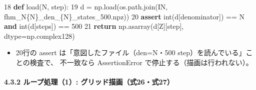 \documentclass[
  a4paper,
]{ltjsarticle}
\newenvironment{Shaded}{}{}
\newcommand{\BuiltInTok}[1]{\textcolor[rgb]{0.00,0.50,0.00}{#1}}
\newcommand{\ControlFlowTok}[1]{\textcolor[rgb]{0.00,0.44,0.13}{\textbf{#1}}}
\newcommand{\DecValTok}[1]{\textcolor[rgb]{0.25,0.63,0.44}{#1}}
\newcommand{\KeywordTok}[1]{\textcolor[rgb]{0.00,0.44,0.13}{\textbf{#1}}}
\newcommand{\NormalTok}[1]{#1}
\newcommand{\OperatorTok}[1]{\textcolor[rgb]{0.40,0.40,0.40}{#1}}
\newcommand{\SpecialCharTok}[1]{\textcolor[rgb]{0.25,0.44,0.63}{#1}}
\newcommand{\SpecialStringTok}[1]{\textcolor[rgb]{0.73,0.40,0.53}{#1}}
\newcommand{\StringTok}[1]{\textcolor[rgb]{0.25,0.44,0.63}{#1}}
\providecommand{\tightlist}{%
  \setlength{\itemsep}{0pt}\setlength{\parskip}{0pt}}
\begin{document}
\begin{Shaded}
\begin{Highlighting}[]
    \DecValTok{18}  \KeywordTok{def}\NormalTok{ load(N, step):}
    \DecValTok{19}\NormalTok{      d }\OperatorTok{=}\NormalTok{ np.load(os.path.join(IN, }\SpecialStringTok{f\textquotesingle{}hm\_N}\SpecialCharTok{\{}\NormalTok{N}\SpecialCharTok{\}}\SpecialStringTok{\_den\_}\SpecialCharTok{\{}\NormalTok{N}\SpecialCharTok{\}}\SpecialStringTok{\_states\_500.npz\textquotesingle{}}\NormalTok{))}
    \DecValTok{20}      \ControlFlowTok{assert} \BuiltInTok{int}\NormalTok{(d[}\StringTok{\textquotesingle{}denominator\textquotesingle{}}\NormalTok{]) }\OperatorTok{==}\NormalTok{ N }\KeywordTok{and} \BuiltInTok{int}\NormalTok{(d[}\StringTok{\textquotesingle{}steps\textquotesingle{}}\NormalTok{]) }\OperatorTok{==} \DecValTok{500}
    \DecValTok{21}      \ControlFlowTok{return}\NormalTok{ np.asarray(d[}\StringTok{\textquotesingle{}Z\textquotesingle{}}\NormalTok{][step], dtype}\OperatorTok{=}\NormalTok{np.complex128)}
\end{Highlighting}
\end{Shaded}

\begin{itemize}
\tightlist
\item
  20行の assert は「意図したファイル（den=N・500
  step）を読んでいる」ことの検査で、 不一致なら AssertionError
  で停止する（描画は行われない）。
\end{itemize}

\paragraph{4.3.2 ループ処理（1）:
グリッド描画（式26・式27）}\label{ux30ebux30fcux30d7ux51e6ux74061-ux30b0ux30eaux30c3ux30c9ux63cfux753bux5f0f26ux5f0f27}
\end{document}
